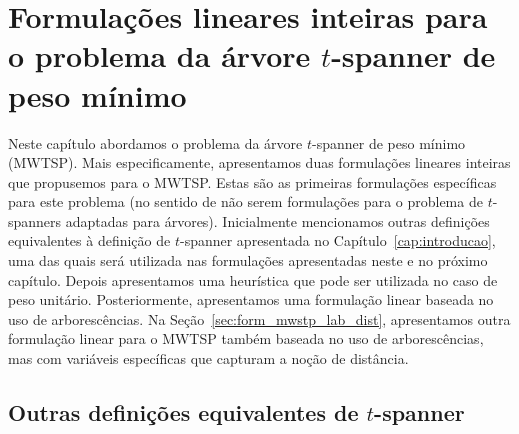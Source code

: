 
\chapter{Formulações lineares inteiras para o problema da árvore $t$-spanner de peso mínimo}
\label{cap:mwstp}
Neste capítulo abordamos o problema da árvore $t$-spanner de
peso mínimo (MWTSP). Mais especificamente, apresentamos duas
formulações lineares inteiras que propusemos para o MWTSP. Estas são
as primeiras formulações específicas para este problema (no sentido de
não serem formulações para o problema de $t$-spanners adaptadas para
árvores).  Inicialmente mencionamos outras definições equivalentes à
definição de $t$-spanner apresentada no
Capítulo~\ref{cap:introducao}, uma das quais será utilizada nas
formulações apresentadas neste e no próximo capítulo.  Depois
apresentamos uma heurística que pode ser utilizada no caso de peso
unitário. Posteriormente, apresentamos uma formulação linear baseada
no uso de arborescências. Na Seção~\ref{sec:form_mwstp_lab_dist},
apresentamos outra formulação linear para o MWTSP também baseada no
uso de arborescências, mas com variáveis específicas que capturam a
noção de distância.

\section{Outras definições equivalentes de $t$-spanner}








